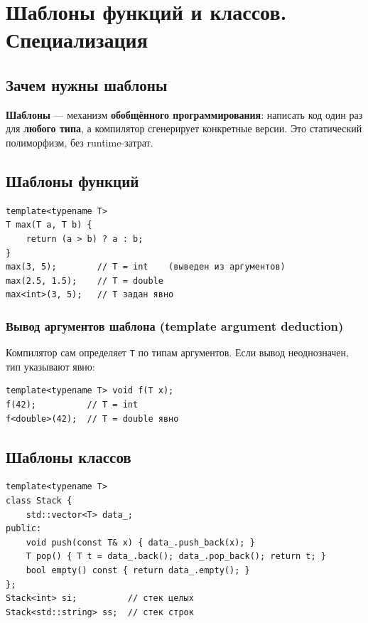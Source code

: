 
\section{Шаблоны функций и классов. Специализация}

\subsection{Зачем нужны шаблоны}

\textbf{Шаблоны} --- механизм \textbf{обобщённого программирования}: написать код
один раз для \textbf{любого типа}, а компилятор сгенерирует конкретные версии.
Это статический полиморфизм, без runtime-затрат.

\subsection{Шаблоны функций}

\begin{lstlisting}
template<typename T>
T max(T a, T b) {
    return (a > b) ? a : b;
}
max(3, 5);        // T = int    (выведен из аргументов)
max(2.5, 1.5);    // T = double
max<int>(3, 5);   // T задан явно
\end{lstlisting}

\subsubsection{Вывод аргументов шаблона (template argument deduction)}

Компилятор сам определяет \texttt{T} по типам аргументов. Если вывод
неоднозначен, тип указывают явно:

\begin{lstlisting}
template<typename T> void f(T x);
f(42);          // T = int
f<double>(42);  // T = double явно
\end{lstlisting}

\subsection{Шаблоны классов}

\begin{lstlisting}
template<typename T>
class Stack {
    std::vector<T> data_;
public:
    void push(const T& x) { data_.push_back(x); }
    T pop() { T t = data_.back(); data_.pop_back(); return t; }
    bool empty() const { return data_.empty(); }
};
Stack<int> si;          // стек целых
Stack<std::string> ss;  // стек строк
\end{lstlisting}

